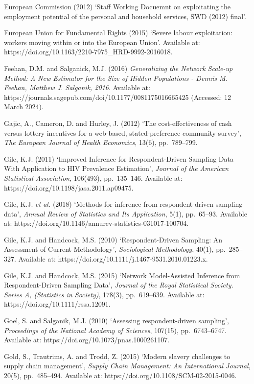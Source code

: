 \documentclass[
  12pt,
  letterpaper,
  DIV=11,
  numbers=noendperiod]{scrartcl}
\begin{document}
European Commission (2012) `Staff Working Docuemnt on exploitating the
employment potential of the personal and household services, SWD (2012)
final'.

European Union for Fundamental Rights (2015) `Severe labour
exploitation: workers moving within or into the European Union'.
Available at: https://doi.org/10.1163/2210-7975\_HRD-9992-2016018.

Feehan, D.M. and Salganick, M.J. (2016) \emph{Generalizing the Network
Scale-up Method: A New Estimator for the Size of Hidden Populations -
Dennis M. Feehan, Matthew J. Salganik, 2016}. Available at:
https://journals.sagepub.com/doi/10.1177/0081175016665425 (Accessed: 12
March 2024).

Gajic, A., Cameron, D. and Hurley, J. (2012) `The cost-effectiveness of
cash versus lottery incentives for a web-based, stated-preference
community survey', \emph{The European Journal of Health Economics},
13(6), pp.~789--799.

Gile, K.J. (2011) `Improved Inference for Respondent-Driven Sampling
Data With Application to HIV Prevalence Estimation', \emph{Journal of
the American Statistical Association}, 106(493), pp.~135--146. Available
at: https://doi.org/10.1198/jasa.2011.ap09475.

Gile, K.J. \emph{et al.} (2018) `Methods for inference from
respondent-driven sampling data', \emph{Annual Review of Statistics and
Its Application}, 5(1), pp.~65--93. Available at:
https://doi.org/10.1146/annurev-statistics-031017-100704.

Gile, K.J. and Handcock, M.S. (2010) `Respondent-Driven Sampling: An
Assessment of Current Methodology', \emph{Sociological Methodology},
40(1), pp.~285--327. Available at:
https://doi.org/10.1111/j.1467-9531.2010.01223.x.

Gile, K.J. and Handcock, M.S. (2015) `Network Model-Assisted Inference
from Respondent-Driven Sampling Data', \emph{Journal of the Royal
Statistical Society. Series A, (Statistics in Society)}, 178(3),
pp.~619--639. Available at: https://doi.org/10.1111/rssa.12091.

Goel, S. and Salganik, M.J. (2010) `Assessing respondent-driven
sampling', \emph{Proceedings of the National Academy of Sciences},
107(15), pp.~6743--6747. Available at:
https://doi.org/10.1073/pnas.1000261107.

Gold, S., Trautrims, A. and Trodd, Z. (2015) `Modern slavery challenges
to supply chain management', \emph{Supply Chain Management: An
International Journal}, 20(5), pp.~485--494. Available at:
https://doi.org/10.1108/SCM-02-2015-0046.
\end{document}
